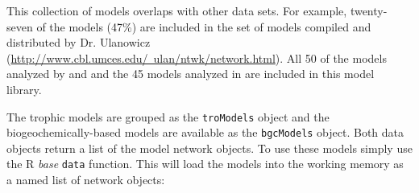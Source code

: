 \documentclass[article]{jss}
\begin{document}
This collection of models overlaps with other data sets.  For example,
twenty-seven of the models (47\%) are included in the set of models
compiled and distributed by Dr. Ulanowicz
(\href{http://www.cbl.umces.edu/~ulan/ntwk/network.html}{http://www.cbl.umces.edu/~ulan/ntwk/network.html}).
All 50 of the models analyzed by \citet{borrett10_hmg} and
\citet{salas11_did} and the 45 models analyzed in \citet{borrett13}
are included in this model library.

The trophic models are grouped as the \texttt{troModels} object and
the biogeochemically-based models are available as the
\texttt{bgcModels} object.  Both data objects return a list of the
model network objects.  To use these models simply use the R
\textit{base} \texttt{data} function. This will load the models into
the working memory as a named list of network objects:
\end{document}
